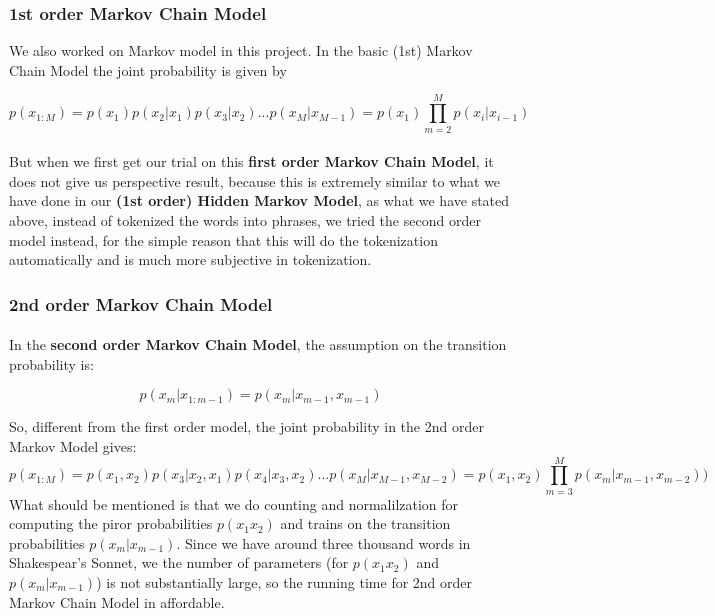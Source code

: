 %
\subsubsection{1st order Markov Chain Model}
We also worked on Markov model in this project. In the basic (1st) Markov Chain Model the joint probability is given by

\begin{equation}
  p(x_{1:M}) = p(x_1)p(x_2|x_1)p(x_3|x_2) ...  p(x_M|x_{M-1}) = p(x_1) \prod\limits_{m=2}^M p(x_i|x_{i-1})
\end{equation}
\paragraph{}
But when we first get our trial on this \textbf{first order Markov Chain Model}, it does not give us perspective result, because this is extremely similar to what we have done in our \textbf{(1st order) Hidden Markov Model}, as what we have stated above, instead of tokenized the words into phrases, we tried the second order model instead, for the simple reason that this will do the tokenization automatically and is much more subjective in tokenization.

\subsubsection{2nd order Markov Chain Model}
\paragraph{}
In the \textbf{second order Markov Chain Model}, the assumption on the transition probability is:

\begin{equation}
  p(x_m|x_{1:m-1}) = p(x_m|x_{m-1}, x_{m-1})
\end{equation}

So, different from the first order model, the joint probability in the 2nd order Markov Model gives:
\begin{equation}
  p(x_{1:M}) =p(x_1, x_2)p(x_3|x_2, x_1)p(x_4|x_3, x_2) ...  p(x_M|x_{M-1}, x_{M-2}) = p(x_1, x_2) \prod\limits_{m=3}^M p(x_m|x_{m-1}, x_{m-2}))
\end{equation} 
What should be mentioned is that we do counting and normalilzation for computing the piror probabilities $p(x_1 x_2)$ and trains on the transition probabilities $p(x_m|x_{m-1})$. Since we have around three thousand words in Shakespear's Sonnet, we the number of parameters (for $p(x_1 x_2)$ and $p(x_m|x_{m-1})$) is not substantially large, so the running time for 2nd order Markov Chain Model in affordable.
